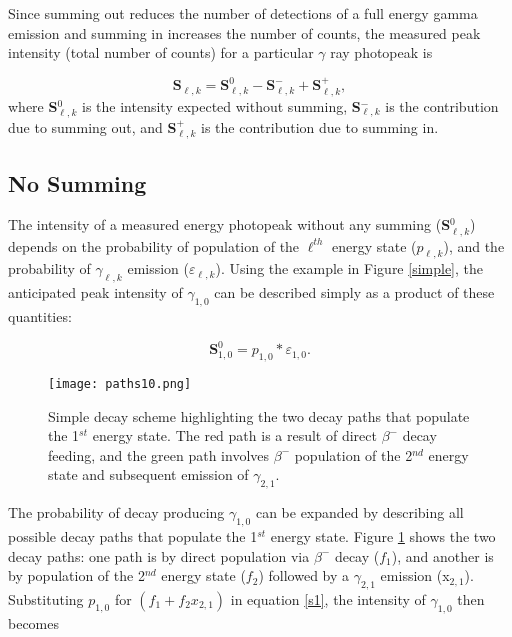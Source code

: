 \documentclass[12pt,twoside]{reedthesis}
\begin{document}
Since summing out reduces the number of detections of a full energy gamma emission and summing in increases the number of counts, the measured peak intensity (total number of counts) for a particular $\gamma$ ray photopeak is

\begin{equation}
\textbf{S}_{\ell,k} = \textbf{S}_{\ell,k}^{0} - \textbf{S}_{\ell,k}^{-} + \textbf{S}_{\ell,k}^{+} ,
\label{S}
\end{equation}
where \textbf{S}$_{\ell,k}^{0}$ is the intensity expected without summing, \textbf{S}$_{\ell,k}^{-}$ is the contribution due to summing out, and \textbf{S}$_{\ell,k}^{+}$ is the contribution due to summing in. 

\subsection{No Summing}

The intensity of a measured energy photopeak without any summing (\textbf{S}$_{\ell,k}^{0}$) depends on the probability of population of the $\ell^{th}$ energy state ($p_{\ell,k}$), and the probability of $\gamma_{\ell,k}$ emission ($\varepsilon_{\ell,k}$). Using the example in Figure \ref{simple}, the anticipated peak intensity of $\gamma_{1,0}$ can be described simply as a product of these quantities:

\begin{equation}
\textbf{S}_{1,0}^{0}  = p_{1,0} * \varepsilon_{1,0}.
\label{s1}
\end{equation} 

 \begin{figure}[h!]
	\centering
	\texttt{[image: paths10.png]}
	\caption{Simple decay scheme highlighting the two decay paths that populate the 1$^{st}$ energy state. The red path is a result of direct $\beta^{-}$ decay feeding, and the green path involves $\beta^{-}$ population of the 2$^{nd}$ energy state and subsequent emission of $\gamma_{2,1}$.}
\label{paths}
\end{figure}

The probability of decay producing $\gamma_{1,0}$ can be expanded by describing all possible decay paths that populate the 1$^{st}$ energy state. Figure \ref{paths} shows the two decay paths: one path is by direct population via $\beta^{-}$ decay ($f_{1}$), and another is by population of the 2$^{nd}$ energy state ($f_{2}$) followed by a $\gamma_{2,1}$ emission (x$_{2,1}$). Substituting $p_{1,0}$ for $(f_{1} + f_{2} x_{2,1})$ in equation \ref{s1}, the intensity of $\gamma_{1,0}$ then becomes
\end{document}
